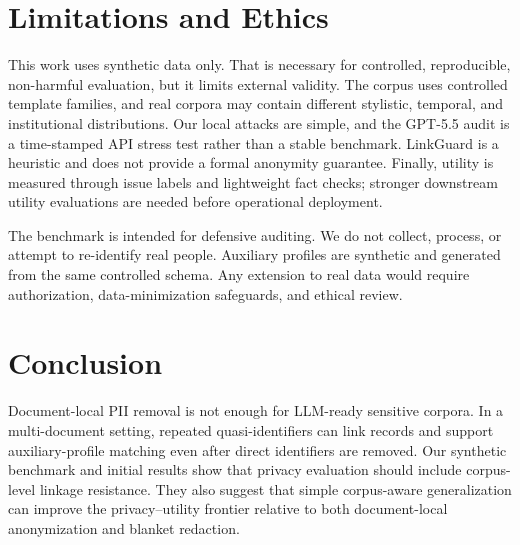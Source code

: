 \documentclass[10pt,twocolumn]{article}
\newcommand{\method}{LinkGuard}
\begin{document}
\section{Limitations and Ethics}
This work uses synthetic data only.
That is necessary for controlled, reproducible, non-harmful evaluation, but it limits external validity.
The corpus uses controlled template families, and real corpora may contain different stylistic, temporal, and institutional distributions.
Our local attacks are simple, and the GPT-5.5 audit is a time-stamped API stress test rather than a stable benchmark.
\method{} is a heuristic and does not provide a formal anonymity guarantee.
Finally, utility is measured through issue labels and lightweight fact checks; stronger downstream utility evaluations are needed before operational deployment.

The benchmark is intended for defensive auditing.
We do not collect, process, or attempt to re-identify real people.
Auxiliary profiles are synthetic and generated from the same controlled schema.
Any extension to real data would require authorization, data-minimization safeguards, and ethical review.

\section{Conclusion}
Document-local PII removal is not enough for LLM-ready sensitive corpora.
In a multi-document setting, repeated quasi-identifiers can link records and support auxiliary-profile matching even after direct identifiers are removed.
Our synthetic benchmark and initial results show that privacy evaluation should include corpus-level linkage resistance.
They also suggest that simple corpus-aware generalization can improve the privacy--utility frontier relative to both document-local anonymization and blanket redaction.
\end{document}
